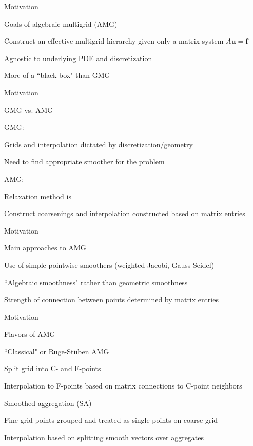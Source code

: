 \documentclass[18pt,xcolor=table]{beamer}
\begin{document}
\begin{frame}{Motivation}
\begin{block}{Goals of algebraic multigrid (AMG)}
\bit
\item Construct an effective multigrid hierarchy given only a matrix system $A\mathbf{u} = \mathbf{f}$
\item Agnostic to underlying PDE and discretization
\item More of a ``black box" than GMG
\eit
\end{block}
\end{frame}

\begin{frame}{Motivation}
\begin{block}{GMG vs. AMG}
\bit
\item GMG:
\bit
\item Grids and interpolation dictated by discretization/geometry
\item Need to find appropriate smoother for the problem
\eit
\item AMG:
\bit
\item Relaxation method is 
\item Construct coarsenings and interpolation constructed based on matrix entries
\eit
\eit
\end{block}
\end{frame}

\begin{frame}{Motivation}
\begin{block}{Main approaches to AMG}
\bit
\item Use of simple pointwise smoothers (weighted Jacobi, Gauss-Seidel)
\item ``Algebraic smoothness" rather than geometric smoothness
\item Strength of connection between points determined by matrix entries
\eit
\end{block}
\end{frame}

\begin{frame}{Motivation}
\begin{block}{Flavors of AMG}
\bit
\item ``Classical" or Ruge-St\"uben AMG
\bit
\item Split grid into C- and F-points
\item Interpolation to F-points based on matrix connections to C-point neighbors
\eit
\item Smoothed aggregation (SA)
\bit
\item Fine-grid points grouped and treated as single points on coarse grid
\item Interpolation based on splitting smooth vectors over aggregates
\eit
\eit
\end{block}
\end{frame}
\end{document}
